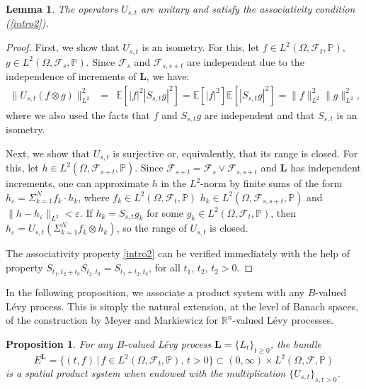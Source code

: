 \documentclass[11pt]{amsart}
\newtheorem{lemma}[theorem]{Lemma}
\newtheorem{proposition}[theorem]{Proposition}
\theoremstyle{definition}
\theoremstyle{remark}
\numberwithin{equation}{section}
\newcommand{\m}{\mathcal }
\begin{document}
\begin{lemma}\label{unitary} The operators $U_{s,t}$ are unitary and satisfy the associativity condition (\ref{intro2}).
\end{lemma} 
\begin{proof} First, we show that \( U_{s,t} \) is an isometry. For this, let \(f\in  L^2(\Omega, \mathcal{F}_t, \mathbb{P})\), \(g\in  L^2(\Omega, \mathcal{F}_s, \mathbb{P})\). Since  \( \mathcal{F}_s \) and \( \mathcal{F}_{s, s + t} \) are independent due to the independence of increments of \( \bm{L} \), we have:
\begin{eqnarray*}
\| U_{s,t}(f \otimes g) \|_{L^2}^2& =& \mathbb{E}\left[ |f|^2 |S_{s,t}g|^2 \right] 
= \mathbb{E}\left[ |f|^2 \right] \mathbb{E}\left[ |S_{s,t}g|^2 \right] = \| f \|_{L^2}^2 \| g \|_{L^2}^2,
\end{eqnarray*}
where we also used the facts that  \( f \) and \( S_{s,t}g \) are independent and that \( S_{s,t} \) is an isometry.

Next, we show that \( U_{s,t} \) is surjective or, equivalently, that its range is closed. For this, let \( h \in L^2(\Omega, \mathcal{F}_{s + t}, \mathbb{P}) \). Since \( \mathcal{F}_{s + t} = \mathcal{F}_s \vee \mathcal{F}_{s, s + t} \) and \( \bm{L} \) has independent increments, one can approximate \( h \) in the \( L^2 \)-norm by finite sums of the form \(h_\varepsilon=\Sigma_{k=1}^Nf_k\cdot h_k\), where \( f_k \in  L^2(\Omega, \mathcal{F}_t, \mathbb{P})\) \(h_k\in  L^2(\Omega, \mathcal{F}_{s, s+t}, \mathbb{P})\) and \(\|h-h_\varepsilon\|_{L^2}<\varepsilon\). If \(h_k=S_{s,t}g_{k}\) for some $g_k\in L^2(\Omega, \mathcal{F}_t, \mathbb{P})$, then $h_\varepsilon=U_{s,t}(\Sigma_{k=1}^Nf_k\otimes h_k)$, so the range of \( U_{s,t} \) is closed.   

The associativity property  \eqref{intro2} can be verified immediately with the help of property  \( S_{t_1, t_2 + t_3}S_{t_2, t_3} = S_{t_1 + t_2, t_3} \), for all \(t_1,\,t_2,\,t_2>0\).
\end{proof}
In the following proposition, we associate a product system with any \(B\)-valued L\'evy process. This is simply the natural extension, at the level of Banach spaces, of the construction by Meyer \cite{Mey} and Markiewicz \cite{Mar0, Mar1} for \(\mathbb{R}^n\)-valued L\'evy processes.
\begin{proposition}
For any \(B\)-valued L\'evy process \(\bm{L}=\{L_t\}_{t\geq 0}\), the bundle \[E^{\bm{L}}=\{(t, f)\,|\,f\in  L^2(\Omega, \mathcal{F}_t, \mathbb{P}),\,t>0\}\subset (0,\infty)\times L^2(\Omega, \m{F}, \mathbb{P})\]  is a spatial product system when endowed with the multiplication \(\{U_{s,t}\}_{s, t>0}\). 
\end{proposition}
\end{document}
